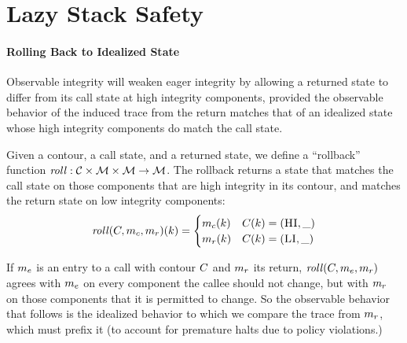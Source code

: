 \documentclass[acmsmall,review,anonymous]{acmart}\settopmatter{printfolios=true,printccs=false,printacmref=false}
\begin{document}


\section{Lazy Stack Safety}
\label{sec:lazy}



    \paragraph{Rolling Back to Idealized State}
      Observable integrity will weaken eager integrity by allowing a returned
      state to differ from its call state at high integrity components,
      provided the observable behavior of the induced trace from the return
      matches that of an idealized state whose high integrity components do
      match the call state.

      Given a contour, a call state, and a returned state, we define a
      ``rollback'' function \(\mathit{roll} : {\mathcal C} \times {\mathcal M} \times
      {\mathcal M} \rightarrow {\mathcal M}\). The rollback returns a state that matches
      the call state on those components that are high integrity in its
      contour, and matches the return state on low integrity components:
      \[\mathit{roll}(C,m_c,m_r)(k) =
      \begin{cases}
        m_c(k) & C(k) = (\textsc{HI},\_) \\
        m_r(k) & C(k) = (\textsc{LI},\_) \\
      \end{cases}\]

      If \(m_e\) is an entry to a call with contour \(C\) and
      \(m_r\) its return, \(\mathit{roll}(C,m_e,m_r)\)
      agrees with \(m_e\) on every component the callee should not change,
      but with \(m_r\) on those components that it is permitted to change.
      So the observable behavior that follows is the idealized behavior to
      which we compare the trace from \(m_r\), which must prefix it (to
      account for premature halts due to policy violations.)
\end{document}
